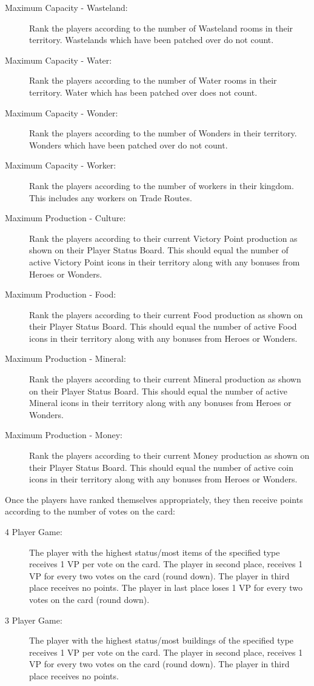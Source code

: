\documentclass[10pt,twocolumn]{article}
\begin{document}
\begin{description}
\item[Maximum Capacity - Wasteland:] Rank the players according to the number of Wasteland rooms in their territory. Wastelands which have been patched over do not count.
\item[Maximum Capacity - Water:] Rank the players according to the number of Water rooms in their territory. Water which has been patched over does not count.
\item[Maximum Capacity - Wonder:] Rank the players according to the number of Wonders in their territory. Wonders which have been patched over do not count.
\item[Maximum Capacity - Worker:] Rank the players according to the number of workers in their kingdom. This includes any workers on Trade Routes.
\item[Maximum Production - Culture:] Rank the players according to their current Victory Point production as shown on their Player Status Board. This should equal the number of active Victory Point icons in their territory along with any bonuses from Heroes or Wonders.
\item[Maximum Production - Food:] Rank the players according to their current Food production as shown on their Player Status Board. This should equal the number of active Food icons in their territory along with any bonuses from Heroes or Wonders.
\item[Maximum Production - Mineral:] Rank the players according to their current Mineral production as shown on their Player Status Board. This should equal the number of active Mineral icons in their territory along with any bonuses from Heroes or Wonders.
\item[Maximum Production - Money:] Rank the players according to their current Money production as shown on their Player Status Board. This should equal the number of active coin icons in their territory along with any bonuses from Heroes or Wonders.
\end{description}
Once the players have ranked themselves appropriately, they then receive points according to the number of votes on the card:

\begin{description}
\item[4 Player Game:] The player with the highest status/most items of the specified type receives 1 VP per vote on the card. The player in second place, receives 1 VP for every two votes on the card (round down). The player in third place receives no points. The player in last place loses 1 VP for every two votes on the card (round down).

\item[3 Player Game:] The player with the highest status/most buildings of the specified type receives 1 VP per vote on the card. The player in second place, receives 1 VP for every two votes on the card (round down). The player in third place receives no points.
\end{description}
\end{document}
